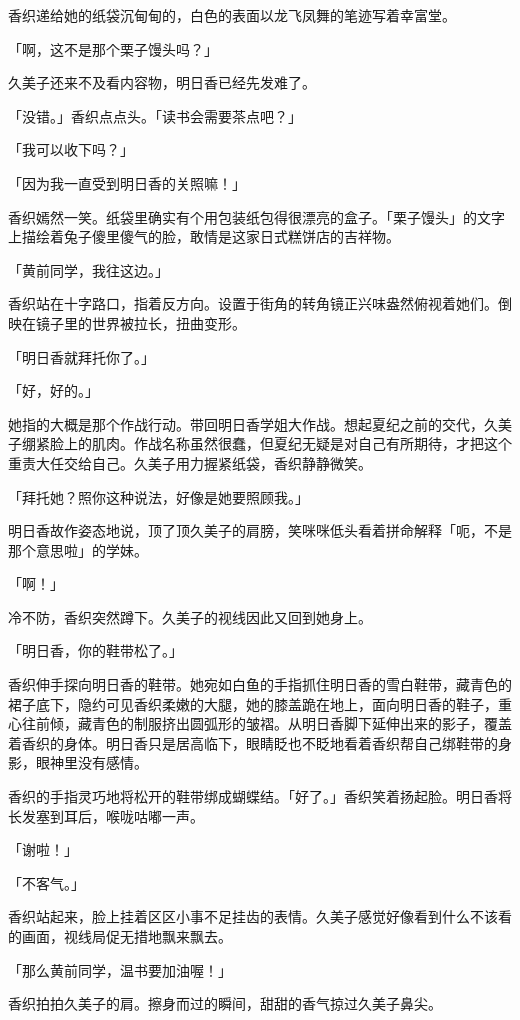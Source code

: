 \documentclass[UTF8]{ctexart}
\begin{document}
    香织递给她的纸袋沉甸甸的，白色的表面以龙飞凤舞的笔迹写着幸富堂。 

    「啊，这不是那个栗子馒头吗？」 

    久美子还来不及看内容物，明日香已经先发难了。 

    「没错。」香织点点头。「读书会需要茶点吧？」 

    「我可以收下吗？」 

    「因为我一直受到明日香的关照嘛！」 

    香织嫣然一笑。纸袋里确实有个用包装纸包得很漂亮的盒子。「栗子馒头」的文字上描绘着兔子傻里傻气的脸，敢情是这家日式糕饼店的吉祥物。 

    「黄前同学，我往这边。」 

    香织站在十字路口，指着反方向。设置于街角的转角镜正兴味盎然俯视着她们。倒映在镜子里的世界被拉长，扭曲变形。 

    「明日香就拜托你了。」 

    「好，好的。」 

    她指的大概是那个作战行动。带回明日香学姐大作战。想起夏纪之前的交代，久美子绷紧脸上的肌肉。作战名称虽然很蠢，但夏纪无疑是对自己有所期待，才把这个重责大任交给自己。久美子用力握紧纸袋，香织静静微笑。 

    「拜托她？照你这种说法，好像是她要照顾我。」 

    明日香故作姿态地说，顶了顶久美子的肩膀，笑咪咪低头看着拼命解释「呃，不是那个意思啦」的学妹。 

    「啊！」 

    冷不防，香织突然蹲下。久美子的视线因此又回到她身上。 

    「明日香，你的鞋带松了。」 

    香织伸手探向明日香的鞋带。她宛如白鱼的手指抓住明日香的雪白鞋带，藏青色的裙子底下，隐约可见香织柔嫩的大腿，她的膝盖跪在地上，面向明日香的鞋子，重心往前倾，藏青色的制服挤出圆弧形的皱褶。从明日香脚下延伸出来的影子，覆盖着香织的身体。明日香只是居高临下，眼睛眨也不眨地看着香织帮自己绑鞋带的身影，眼神里没有感情。 

    香织的手指灵巧地将松开的鞋带绑成蝴蝶结。「好了。」香织笑着扬起脸。明日香将长发塞到耳后，喉咙咕嘟一声。 

    「谢啦！」 

    「不客气。」 

    香织站起来，脸上挂着区区小事不足挂齿的表情。久美子感觉好像看到什么不该看的画面，视线局促无措地飘来飘去。 

    「那么黄前同学，温书要加油喔！」 

    香织拍拍久美子的肩。擦身而过的瞬间，甜甜的香气掠过久美子鼻尖。 
\end{document}
